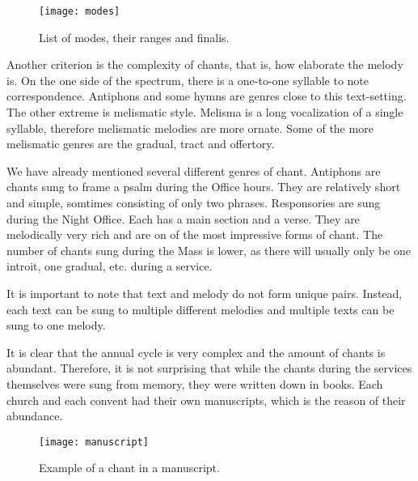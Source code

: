 \begin{figure}[h]
\centering
\texttt{[image: modes]}
\caption{List of modes, their ranges and finalis. \cite[p.~44]{chant_book}}
\end{figure}

Another criterion is the complexity of chants, that is, how elaborate the melody is. On the one side of the spectrum, there is a one-to-one
syllable to note correspondence. Antiphons and some hymns are genres close to this text-setting. The other extreme is melismatic style. Melisma
is a long vocalization of a single syllable, therefore melismatic melodies are more ornate. Some of the more melismatic genres are the gradual,
tract and offertory.

We have already mentioned several different genres of chant. Antiphons are chants sung to frame a psalm during the Office hours. They are relatively
short and simple, somtimes consisting of only two phrases. Responsories are sung during the Night Office. Each has a main section and a verse. They are
melodically very rich and are on of the most impressive forms of chant. The number of chants sung during the Mass is lower, as there will usually
only be one introit, one gradual, etc. during a service.

It is important to note that text and melody do not form unique pairs. Instead, each text
can be sung to multiple different melodies and multiple texts can be sung to one melody.

It is clear that the annual cycle is very complex and the amount of chants is abundant. Therefore, it is not surprising that while the chants during the
services themselves were sung from memory, they were written down in books. Each church and each convent had their own manuscripts, which is the
reason of their abundance.

\begin{figure}[h]
\centering
\texttt{[image: manuscript]}
\caption{Example of a chant in a manuscript. \cite[id~007553]{cantus_db}}
\end{figure}

